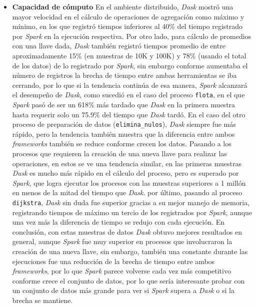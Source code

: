 \begin{itemize}
	\item \textbf{Capacidad de cómputo} En el ambiente distribuido, \textit{Dask} mostró una mayor velocidad en el cálculo de operaciones de agregación como máximo y mínimo, en los que registró tiempos inferiores al 40\% del tiempo registrado por \textit{Spark} en la ejecución respectiva. Por otro lado, para cálculo de promedios con una llave dada, \textit{Dask} también registró tiempos promedio de entre aproximadamente 15\% (en muestras de 10K y 100K) y 78\% (usando el total de los datos) de lo registrado por \textit{Spark}, sin embargo conforme aumentaba el número de registros la brecha de tiempo entre ambas herramientas se iba cerrando, por lo que si la tendencia continúa de esa manera, \textit{Spark} alcanzará el desempeño de \textit{Dask}, como sucedió en el caso del proceso \texttt{flota}, en el que \textit{Spark} pasó de ser un 618\% más tardado que \textit{Dask} en la primera muestra hasta requerir solo un 75.9\% del tiempo que \textit{Dask} tardó. En el caso del otro proceso de preparación de datos (\texttt{elimina\_nulos}), \textit{Dask} siempre fue más rápido, pero la tendencia también muestra que la diferencia entre ambos \textit{frameworks} también se reduce conforme crecen los datos. Pasando a los procesos que requieren la creación de una nueva llave para realizar las operaciones, en estos se ve una tendencia similar, en las primeras muestras \textit{Dask} es mucho más rápido en el cálculo del proceso, pero es superado por \textit{Spark}, que logra ejecutar los procesos con las muestras superiores a 1 millón en menos de la mitad del tiempo que \textit{Dask}. por último, pasando al proceso \texttt{dijkstra}, \textit{Dask} sin duda fue superior gracias a su mejor manejo de memoria, registrando tiempos de máximo un tercio de los registrados por \textit{Spark}, aunque una vez más la diferencia de tiempo se redujo con cada ejecución. En conclusión, con estas muestras de datos \textit{Dask} obtuvo mejores resultados en general, aunque \textit{Spark} fue muy superior en procesos que involucraron la creación de una nueva llave, sin embargo, también una constante durante las ejecuciones fue una reducción de la brecha de tiempo entre ambos \textit{frameworks}, por lo que \textit{Spark} parece volverse cada vez más competitivo conforme crece el conjunto de datos, por lo que sería interesante probar con un conjunto de datos más grande para ver si \textit{Spark} supera a \textit{Dask} o si la brecha se mantiene.
	

\end{itemize}
